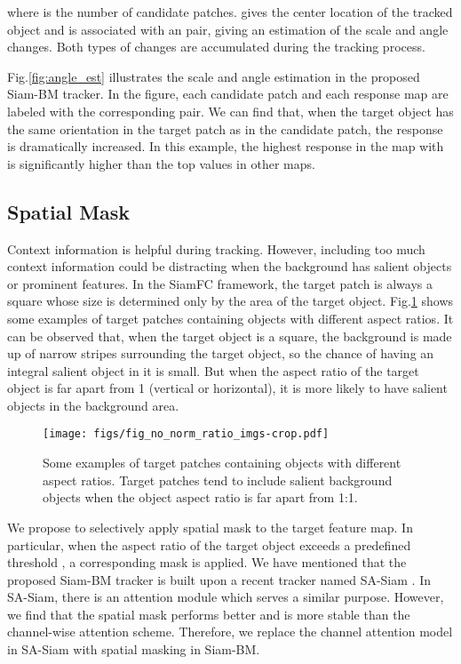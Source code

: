 \documentclass[runningheads]{llncs}
\begin{document}
where  is the number of candidate patches.  gives the center location of the tracked object and  is associated with an  pair, giving an estimation of the scale and angle changes. Both types of changes are accumulated during the tracking process. 

Fig.\ref{fig:angle_est} illustrates the scale and angle estimation in the proposed Siam-BM tracker. In the figure, each candidate patch and each response map are labeled with the corresponding  pair. We can find that, when the target object has the same orientation in the target patch as in the candidate patch, the response is dramatically increased. In this example, the highest response in the map with  is significantly higher than the top values in other maps. 

\subsection{Spatial Mask}
    
Context information is helpful during tracking. However, including too much context information could be distracting when the background has salient objects or prominent features. In the SiamFC framework, the target patch is always a square whose size is determined only by the area of the target object. Fig.\ref{fig:example_ar} shows some examples of target patches containing objects with different aspect ratios. It can be observed that, when the target object is a square, the background is made up of narrow stripes surrounding the target object, so the chance of having an integral salient object in it is small. But when the aspect ratio of the target object is far apart from 1 (vertical or horizontal), it is more likely to have salient objects in the background area. 

\begin{figure}[th!]
    \begin{center}
    \texttt{[image: figs/fig\_no\_norm\_ratio\_imgs-crop.pdf]}
    \end{center}
    \caption{Some examples of target patches containing objects with different aspect ratios. Target patches tend to include salient background objects when the object aspect ratio is far apart from 1:1. }
    \label{fig:example_ar}
\end{figure}


We propose to selectively apply spatial mask to the target feature map. In particular, when the aspect ratio of the target object exceeds a predefined threshold , a corresponding mask is applied. 
We have mentioned that the proposed Siam-BM tracker is built upon a recent tracker named SA-Siam \cite{SASiam}. In SA-Siam, there is an attention module which serves a similar purpose. However, we find that the spatial mask performs better and is more stable than the channel-wise attention scheme. Therefore, we replace the channel attention model in SA-Siam with spatial masking in Siam-BM.
\end{document}
